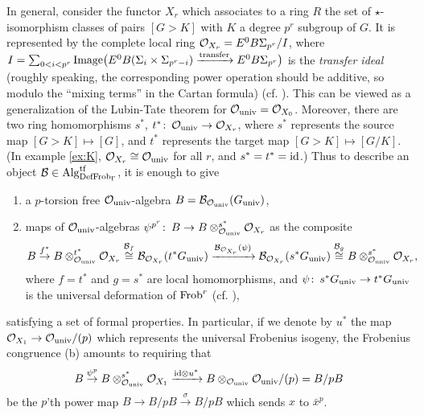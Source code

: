 \documentclass{gtpart}
\theoremstyle{definition}
\theoremstyle{remark}
\def\co{\colon\thinspace}
\newcommand{\Alg}{{\rm Alg}}
\newcommand{\Frob}{{\rm Frob}}
\newcommand{\CO}{{\cal O}}
\newcommand{\DF}{{{\rm DefFrob}_\Gamma}}
\begin{document}
In general, consider the functor $X_r$ which associates to a ring $R$ the set of 
$\star$-isomorphism classes of pairs $[G > K]$ with $K$ a degree $p^r$ 
subgroup of $G$.  It is represented by the complete local ring $\CO_{X_r} = 
E^0 B\Sigma_{p^r}/I$, where $I = \sum_{0<i<p^r} 
{\rm Image}\big(E^0 B(\Sigma_i\times\Sigma_{p^r-i}) 
\xrightarrow{\text{transfer}} E^0 B\Sigma_{p^r}\big)$ is the 
{\em transfer ideal} (roughly speaking, the corresponding power operation 
should be additive, so modulo the ``mixing terms'' in the Cartan formula) (cf. \cite[theorem 9.2]{strickland}).  
This can be viewed as a generalization of the Lubin-Tate theorem for 
$\CO_{\rm univ} = \CO_{X_0}$.  Moreover, there are two ring homomorphisms 
$s^*$, $t^*\co \CO_{\rm univ} \to \CO_{X_r}$, where $s^*$ represents the 
source map $[G > K] \mapsto [G]$, and $t^*$ represents the target map 
$[G > K] \mapsto [G/K]$.  (In example \ref{ex:K}, 
$\CO_{X_r} \cong \CO_{\rm univ}$ for all $r$, and $s^* = t^* = 
{\rm id}$.)  Thus to describe an object ${\cal B} \in \Alg_\DF^{\rm tf}$, it is 
enough to give 
\begin{enumerate}
\item a $p$-torsion free $\CO_{\rm univ}$-algebra 
$B = {\cal B}_{\CO_{\rm univ}}(G_{\rm univ})$, 
\item maps of $\CO_{\rm univ}$-algebras 
$\psi^{p^r}\co B \to B \otimes_{\CO_{\rm univ}}^{s^*} \CO_{X_r}$ 
as the composite 
\[
 B \stackrel{f^*}{\to} B \otimes_{\CO_{\rm univ}}^{t^*} \CO_{X_r} 
\stackrel{{\cal B}_f}{\cong} {\cal B}_{\CO_{X_r}} (t^*G_{\rm univ}) 
\xrightarrow{{\cal B}_{\CO_{X_r}} (\psi)} {\cal B}_{\CO_{X_r}} (s^*G_{\rm univ}) 
\stackrel{{\cal B}_g}{\cong} B \otimes_{\CO_{\rm univ}}^{s^*} \CO_{X_r}, 
\]
where $f = t^*$ and $g = s^*$ are local homomorphisms, and 
$\psi\co s^*G_{\rm univ} \to t^*G_{\rm univ}$ is the 
universal deformation of $\Frob^r$ (cf. \cite[section 13]{strick}),
\end{enumerate}
satisfying a set of formal properties.  In particular, if we denote by 
$u^*$ the map $\CO_{X_1} \to \CO_{\rm univ}/(p)$ which represents the 
universal Frobenius isogeny, the Frobenius congruence (b) amounts to 
requiring that 
\[
 B \stackrel{\psi^p}{\to} B \otimes_{\CO_{\rm univ}}^{s^*} \CO_{X_1} 
\xrightarrow{{\rm id} \otimes u^*} B \otimes_{\CO_{\rm univ}} \CO_{\rm univ}/(p) 
= B/pB
\]
be the $p$'th power map $B \to B/pB \stackrel{\sigma}{\to} B/pB$ which sends $x$ to $\bar{x}^p$.  
\end{document}
